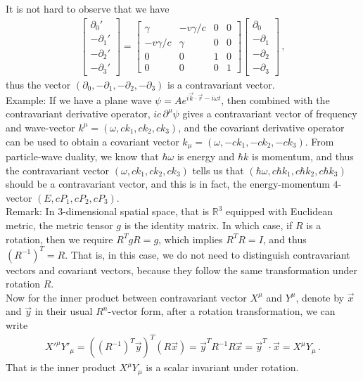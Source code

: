 \documentclass[11pt, onesided]{book}
\theoremstyle{break}
\theoremstyle{break}
\newcommand{\R}{\mathbb{R}}
\newcommand{\pd}{\partial}
\newcommand{\bmat}[1]{\begin{bmatrix} #1 \end{bmatrix}}
\newcommand{\remark}{\color{blue}Remark: \color{black}}
\newcommand{\example}{\color{green}Example: \color{black}}
\begin{document}
It is not hard to observe that we have
\begin{align*}
\bmat{\pd_0'\\
-\pd_1'\\
-\pd_2'\\
-\pd_3'} = 
\bmat{\gamma & -v\gamma/c & 0 & 0\\
-v\gamma/c & \gamma &0 &0\\
0 &0 &1 &0\\
0 & 0&0 & 1}
\bmat{\pd_0\\
-\pd_1\\
-\pd_2\\
-\pd_3}\,,
\end{align*}
thus the vector $(\pd_0, -\pd_1,-\pd_2,-\pd_3)$ is a contravariant vector. \\

\example If we have a plane wave $\psi = Ae^{i\vec{k}\cdot \vec{r}-i\omega t}$, then combined with the contravariant derivative operator, $ic\,\pd^\mu \psi$ gives a contravariant vector of frequency and wave-vector $k^\mu = (\omega, ck_1, ck_2, ck_3)$, and the covariant derivative operator can be used to obtain a covariant vector $k_\mu = (\omega, -ck_1, -ck_2,-ck_3)$. From particle-wave duality, we know that $\hbar \omega$ is energy and $\hbar k$ is momentum, and thus the contravariant vector $(\omega, ck_1, ck_2, ck_3)$ tells us that $(\hbar \omega, c\hbar k_1, c\hbar k_2, c\hbar k_3)$ should be a contravariant vector, and this is in fact, the energy-momentum $4$-vector $(E, cP_1, cP_2, cP_3)$. \\

\remark In $3$-dimensional spatial space, that is $\R^3$ equipped with Euclidean metric, the metric tensor $g$ is the identity matrix. In which case, if $R$ is a rotation, then we require $R^TgR = g$, which implies $R^T R = I$, and thus $(R^{-1})^T = R$. That is, in this case, we do not need to distinguish contravariant vectors and covariant vectors, because they follow the same transformation under rotation $R$. \\



Now for the inner product between contravariant vector $X^\mu$ and $Y^\mu$, denote by $\vec{x}$ and $\vec{y}$ in their usual $R^n$-vector form, after a rotation transformation, we can write
\begin{align*}
X'^\mu Y'_\mu = ((R^{-1})^T \vec{y})^T (R\vec{x}) = \vec{y}^T R^{-1}R \vec{x} = \vec{y}^T\cdot \vec{x} = X^\mu Y_\mu\,.
\end{align*}
That is the inner product $X^\mu Y_\mu$ is a scalar invariant under rotation.\\
\end{document}
